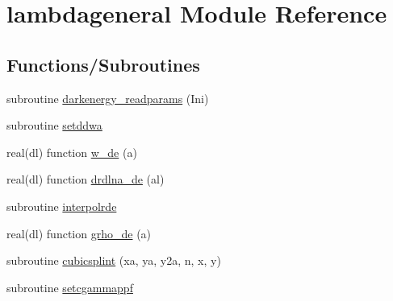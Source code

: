 \hypertarget{namespacelambdageneral}{}\section{lambdageneral Module Reference}
\label{namespacelambdageneral}
\subsection*{Functions/\+Subroutines}
\begin{DoxyCompactItemize}
\item 
subroutine \mbox{\hyperlink{namespacelambdageneral_a780328d728ca15af725d6f53b2fa54d1}{darkenergy\+\_\+readparams}} (Ini)
\item 
subroutine \mbox{\hyperlink{namespacelambdageneral_ad21de3de68d0d0e75156e818dd8b49e1}{setddwa}}
\item 
real(dl) function \mbox{\hyperlink{namespacelambdageneral_a5025e65d45f07326ea66833cbab495d3}{w\+\_\+de}} (a)
\item 
real(dl) function \mbox{\hyperlink{namespacelambdageneral_a446a7b395384f258ea37364624b12206}{drdlna\+\_\+de}} (al)
\item 
subroutine \mbox{\hyperlink{namespacelambdageneral_ac5a1ca91bd76eaf1d2f8e05944b798d6}{interpolrde}}
\item 
real(dl) function \mbox{\hyperlink{namespacelambdageneral_a07db6feea7db4bda2dd9465dafa7895f}{grho\+\_\+de}} (a)
\item 
subroutine \mbox{\hyperlink{namespacelambdageneral_ac223e519da99aef58a91fb3932b7c438}{cubicsplint}} (xa, ya, y2a, n, x, y)
\item 
subroutine \mbox{\hyperlink{namespacelambdageneral_a2e52a5cb604fe6d314c2bdbfc3d6b723}{setcgammappf}}
\end{DoxyCompactItemize}
